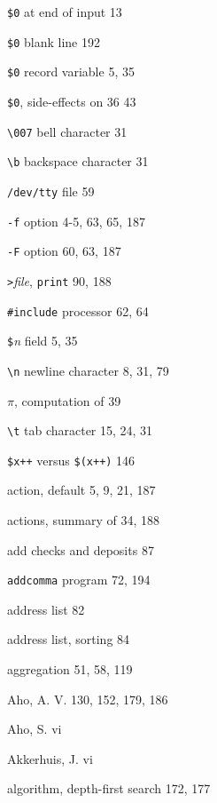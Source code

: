 \begin{multicols}{3}
\hangindent=3pc  \verb'$0' at end of input 13

\hangindent=3pc  \verb'$0' blank line 192

\hangindent=3pc  \verb'$0' record variable 5, 35

\hangindent=3pc  \verb'$0', side-effects on 36 43

\hangindent=3pc  \verb'\007' bell character 31

\hangindent=3pc  \verb'\b' backspace character 31

\hangindent=3pc  \verb'/dev/tty' file 59

\hangindent=3pc  \verb'-f' option 4-5, 63, 65, 187

\hangindent=3pc  \verb'-F' option 60, 63, 187

\hangindent=3pc  \verb'>'\textit{file}, \verb'print' 90, 188

\hangindent=3pc  \verb'#include' processor 62, 64

\hangindent=3pc  \verb'$'\textit{n} field 5, 35

\hangindent=3pc  \verb'\n' newline character 8, 31, 79

\hangindent=3pc  $\pi$, computation of 39

\hangindent=3pc  \verb'\t' tab character 15, 24, 31

\hangindent=3pc  \verb'$x++' versus \verb'$(x++)' 146

\hangindent=3pc  action, default 5, 9, 21, 187

\hangindent=3pc  actions, summary of 34, 188

\hangindent=3pc  add checks and deposits 87

\hangindent=3pc  \verb'addcomma' program 72, 194

\hangindent=3pc  address list 82

\hangindent=3pc  address list, sorting 84

\hangindent=3pc  aggregation 51, 58, 119

\hangindent=3pc  Aho, A. V. 130, 152, 179, 186

\hangindent=3pc  Aho, S. vi

\hangindent=3pc  Akkerhuis, J. vi

\hangindent=3pc  algorithm, depth-first search 172, 177


\end{multicols}
